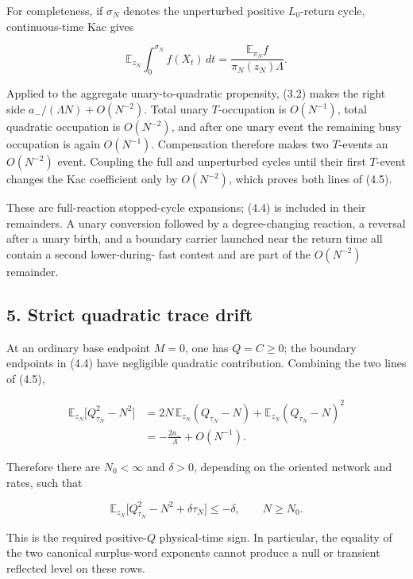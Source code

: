 For completeness, if \(\sigma_N\) denotes the unperturbed positive
\(L_0\)-return cycle, continuous-time Kac gives

\[
 {\mathbb E}_{z_N}\int_0^{\sigma_N} f(X_t)\,dt
 =\frac{{\mathbb E}_{\pi_N}f}
        {\pi_N(z_N)\Lambda}.                         \tag{4.5a}
\]

Applied to the aggregate unary-to-quadratic propensity, (3.2) makes the
right side \(a_-/(\Lambda N)+O(N^{-2})\). Total unary \(T\)-occupation
is \(O(N^{-1})\), total quadratic occupation is \(O(N^{-2})\), and after
one unary event the remaining busy occupation is again \(O(N^{-1})\).
Compensation therefore makes two \(T\)-events an \(O(N^{-2})\) event.
Coupling the full and unperturbed cycles until their first \(T\)-event
changes the Kac coefficient only by \(O(N^{-2})\), which proves both
lines of (4.5).

These are full-reaction stopped-cycle expansions; (4.4) is included in
their remainders. A unary conversion followed by a degree-changing
reaction, a reversal after a unary birth, and a boundary carrier
launched near the return time all contain a second lower-during- fast
contest and are part of the \(O(N^{-2})\) remainder.

\subsection{5. Strict quadratic trace
drift}

At an ordinary base endpoint \(M=0\), one has \(Q=C\geq0\); the boundary
endpoints in (4.4) have negligible quadratic contribution. Combining the
two lines of (4.5),

\[
 \begin{aligned}
 \mathbb E_{z_N}\bigl[Q_{\tau_N}^2-N^2\bigr]
 &=2N\,\mathbb E_{z_N}(Q_{\tau_N}-N)
   +\mathbb E_{z_N}(Q_{\tau_N}-N)^2\\
 &=-\frac{2a_-}{\Lambda}+O(N^{-1}).
 \end{aligned}\tag{5.1}
\]

Therefore there are \(N_0<\infty\) and \(\delta>0\), depending on the
oriented network and rates, such that

\[
 \mathbb E_{z_N}\bigl[Q_{\tau_N}^2-N^2+\delta\tau_N\bigr]
 \leq-\delta,\qquad N\geq N_0.                       \tag{5.2}
\]

This is the required positive-\(Q\) physical-time sign. In particular,
the equality of the two canonical surplus-word exponents cannot produce
a null or transient reflected level on these rows.

